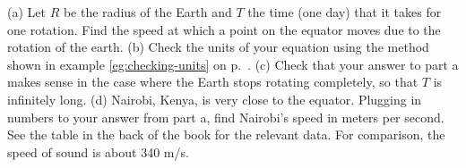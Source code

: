 (a) Let $R$ be the radius of the Earth and $T$ the time (one day) that it takes for one rotation. Find the
speed at which a point on the equator moves due to the rotation of the earth.\answercheck\hwendpart
(b) Check the units of your equation using the method shown in example \ref{eg:checking-units}
on p.~\pageref{eg:checking-units}.\hwendpart
(c) Check that your answer to part a makes sense in the case where the Earth stops rotating completely,
so that $T$ is infinitely long.\hwendpart
(d) Nairobi, Kenya, is very close to the equator. Plugging in numbers to your answer from part a,
find Nairobi's speed in meters per second. See the table in
the back of the book for the relevant data. For comparison, the speed of sound
is about 340 m/s.\answercheck\hwendpart
